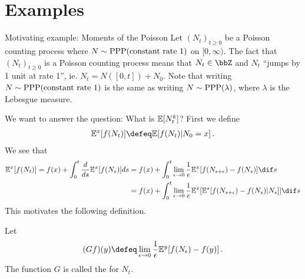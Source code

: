 \documentclass[../../../Master/AppliedStochastics.tex]{subfiles}
\author{Helen}
\date{22 October 2018}
\begin{document}
%


\makelecture


\section{Examples}

\begin{example}{Motivating example: Moments of the Poisson}
    Let $(N_t)_{t \geq 0}$ be a Poisson counting process
        where $N \sim \operatorname{PPP}(\text{constant rate 1})$ on $[0, \infty)$.
    The fact that $(N_t)_{t \geq 0}$ is a Poisson counting process means
        that $N_t \in \bbZ$ and $N_t$ ``jumps by 1 unit at rate 1'',
        ie. $N_t = N([0, t]) + N_0$. 
    Note that writing $N \sim \operatorname{PPP}(\text{constant rate 1})$
        is the same as writing $N \sim \operatorname{PPP}(\lambda)$,
            where $\lambda$ is the Lebesgue measure.
    
    
    We want to answer the question:
        What is $\mathbb{E}[N_t^k]$?
    First we define
    $$\begin{aligned}
        \E^x[f(N_t)] \defeq \E[f(N_t) | N_0 = x ]\,.
    \end{aligned}$$
    We see that
    $$\begin{aligned}\label{condexp1}
        \E^x[f(N_t)] = f(x) + \int_0^t \frac{d}{ds} \E^x [f(N_s)] ds
                    &= f(x) + \int_0^t \lim_{\epsilon \to 0}
                        \frac{1}{\epsilon} \E^x [f(N_{s+\epsilon}) - f(N_s)]
                        \dif s\\
                    &= f(x) + \int_0^t  \lim_{\epsilon \to 0}
                        \frac{1}{\epsilon} \E^x [
                            \E^s [f(N_{s+\epsilon}) - f(N_s) | N_s] ] \dif s
    \end{aligned}$$
    This motivates the following definition.
    \begin{definition}
        Let
        $$\begin{aligned}
            (Gf)(y) \defeq \lim_{\epsilon \to 0} \frac{1}{\epsilon}
                            \E^{y}[f(N_\epsilon) - f(y)]\,.
        \end{aligned}$$
    The function $G$ is called the  for $N_t$. 
    \end{definition}
    

\end{example}
\end{document}
